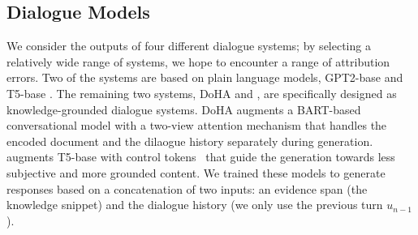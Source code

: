 \subsection{Dialogue Models} We consider the outputs of four different dialogue systems; by selecting a relatively wide range of systems, we hope to encounter a range of attribution errors. Two of the systems are based on plain language models, GPT2-base \cite{radford2019language} and T5-base \cite{raffel2020exploring}. %
 The remaining two systems, DoHA \cite{prabhumoye-etal-2021-focused} and \CTRL{} \cite{rashkin-etal-2021-increasing}, are specifically designed as knowledge-grounded dialogue systems. 
DoHA augments a BART-based conversational model \cite{lewis2020bart} with a two-view attention mechanism that handles  the encoded document and the dilaogue history separately during generation. \CTRL{} augments T5-base with control tokens~\cite{keskar2019ctrl} that guide the generation towards less subjective and more grounded content.  We trained these models to generate responses based on a concatenation of two inputs: an evidence span (the knowledge snippet) and the dialogue history (we only use the previous turn $u_{n-1}$). 








